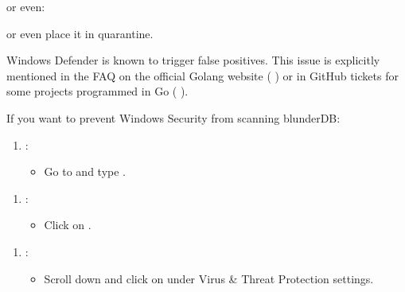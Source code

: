 \documentclass[letterpaper,10pt,english]{sphinxmanual}
\begin{document}
\sphinxAtStartPar
or even:

\begin{figure}[htbp]
\centering

\noindent{}
\end{figure}

\sphinxAtStartPar
or even place it in quarantine.

\sphinxAtStartPar
Windows Defender is known to trigger false positives. This issue is explicitly mentioned in the FAQ on the official Golang website (  ) or in GitHub tickets for some projects programmed in Go (  ).

\sphinxAtStartPar
If you want to prevent Windows Security from scanning blunderDB:
\begin{enumerate}
%
\item {} 
\sphinxAtStartPar
{}:
\begin{itemize}
\item {} 
\sphinxAtStartPar
Go to  and type .

\end{itemize}

\end{enumerate}

\begin{figure}[htbp]
\centering

\noindent{}
\end{figure}
\begin{enumerate}
%
\setcounter{enumi}{1}
\item {} 
\sphinxAtStartPar
{}:
\begin{itemize}
\item {} 
\sphinxAtStartPar
Click on .

\end{itemize}

\end{enumerate}

\begin{figure}[htbp]
\centering

\noindent{}
\end{figure}
\begin{enumerate}
%
\setcounter{enumi}{2}
\item {} 
\sphinxAtStartPar
{}:
\begin{itemize}
\item {} 
\sphinxAtStartPar
Scroll down and click on  under Virus \& Threat Protection settings.

\end{itemize}

\end{enumerate}
\end{document}

